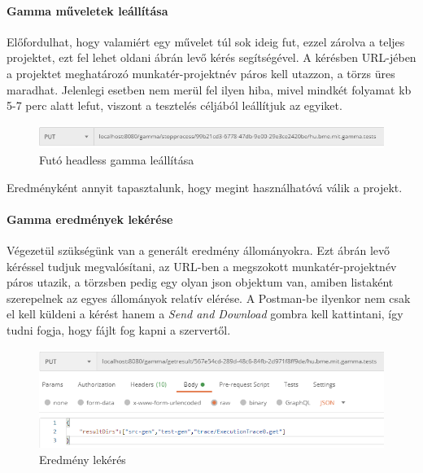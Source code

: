 \paragraph{Gamma műveletek leállítása} Előfordulhat, hogy valamiért egy művelet túl sok ideig fut, ezzel zárolva a teljes projektet, ezt fel lehet oldani  ábrán levő kérés segítségével. A kérésben URL-jében a projektet meghatározó munkatér-projektnév páros kell utazzon, a törzs üres maradhat. Jelenlegi esetben nem merül fel ilyen hiba, mivel mindkét folyamat kb 5-7 perc alatt lefut, viszont a tesztelés céljából leállítjuk az egyiket.


\begin{figure}[!ht]
	\includegraphics[width=150mm, keepaspectratio]{figures/stop_gamma_request.PNG}
	\caption{Futó headless gamma leállítása}
	\label{fig:stop_gamma_request}
\end{figure}

Eredményként annyit tapasztalunk, hogy megint használhatóvá válik a projekt.

\paragraph{Gamma eredmények lekérése} Végezetül szükségünk van a generált eredmény állományokra. Ezt  ábrán levő kéréssel tudjuk megvalósítani, az URL-ben a megszokott munkatér-projektnév páros utazik, a törzsben pedig egy olyan json objektum van, amiben listaként szerepelnek az egyes állományok relatív elérése. A Postman-be ilyenkor nem csak el kell küldeni a kérést hanem a \textit{Send and Download} gombra kell kattintani, így tudni fogja, hogy fájlt fog kapni a szervertől.

\begin{figure}[!ht]
	\includegraphics[width=150mm, keepaspectratio]{figures/get_result_request.PNG}
	\caption{Eredmény lekérés}
	\label{fig:get_result_request}
\end{figure}

